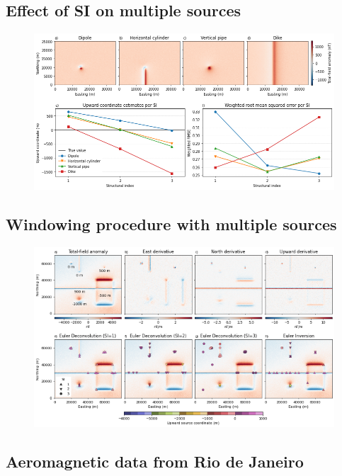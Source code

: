 \subsection{Effect of SI on multiple sources}

\begin{figure}[tb!]
\centering
\includegraphics[width=1\linewidth]{figures/synthetic-structural-index.png}
\caption{
  \lipsum[1]
}
\label{fig:si}
\end{figure}

\subsection{Windowing procedure with multiple sources}

\begin{figure}[tb!]
\centering
\includegraphics[width=1\linewidth]{figures/synthetic-windows.png}
\caption{
  \lipsum[1]
}
\label{fig:windows}
\end{figure}

\subsection{Aeromagnetic data from Rio de Janeiro}

